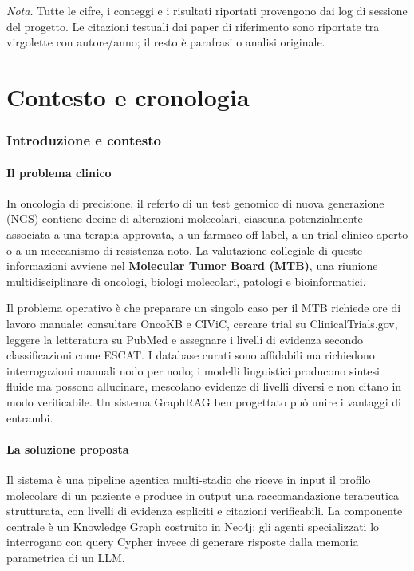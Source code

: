 \documentclass[11pt,a4paper]{article}
\begin{document}
\vspace{4pt}
\noindent\textit{Nota.} Tutte le cifre, i conteggi e i risultati riportati provengono dai log di sessione del progetto. Le citazioni testuali dai paper di riferimento sono riportate tra virgolette con autore/anno; il resto \`e parafrasi o analisi originale.

\clearpage
\tableofcontents
\clearpage

\part{Contesto e cronologia}

\section{Introduzione e contesto}

\subsection{Il problema clinico}
In oncologia di precisione, il referto di un test genomico di nuova generazione (NGS) contiene decine di alterazioni molecolari, ciascuna potenzialmente associata a una terapia approvata, a un farmaco off-label, a un trial clinico aperto o a un meccanismo di resistenza noto. La valutazione collegiale di queste informazioni avviene nel \textbf{Molecular Tumor Board (MTB)}, una riunione multidisciplinare di oncologi, biologi molecolari, patologi e bioinformatici.

Il problema operativo \`e che preparare un singolo caso per il MTB richiede ore di lavoro manuale: consultare OncoKB e CIViC, cercare trial su ClinicalTrials.gov, leggere la letteratura su PubMed e assegnare i livelli di evidenza secondo classificazioni come ESCAT. I database curati sono affidabili ma richiedono interrogazioni manuali nodo per nodo; i modelli linguistici producono sintesi fluide ma possono allucinare, mescolano evidenze di livelli diversi e non citano in modo verificabile. Un sistema GraphRAG ben progettato pu\`o unire i vantaggi di entrambi.

\subsection{La soluzione proposta}
Il sistema \`e una pipeline agentica multi-stadio che riceve in input il profilo molecolare di un paziente e produce in output una raccomandazione terapeutica strutturata, con livelli di evidenza espliciti e citazioni verificabili. La componente centrale \`e un Knowledge Graph costruito in Neo4j: gli agenti specializzati lo interrogano con query Cypher invece di generare risposte dalla memoria parametrica di un LLM.
\end{document}

